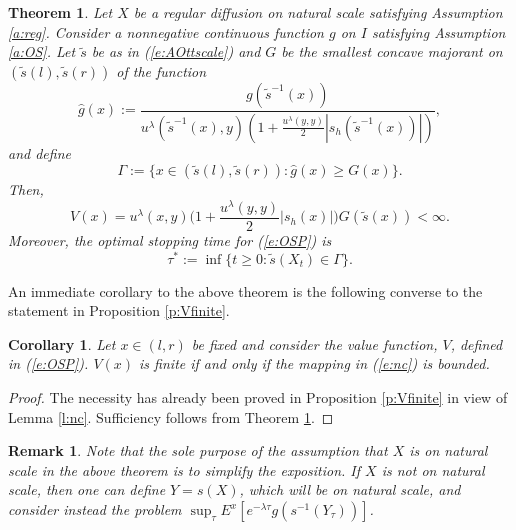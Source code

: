 \documentclass[11pt,reqno]{amsart}
\numberwithin{equation}{section}
\newtheorem{theorem}{Theorem}[section]
\newtheorem{corollary}{Corollary}[section]
\newtheorem{remark}{Remark}[section]
\begin{document}
\begin{theorem} \label{t:OS}
	Let $X$ be a regular diffusion on natural scale satisfying Assumption \ref{a:reg}. Consider  a nonnegative continuous function $g$  on $I$ satisfying Assumption \ref{a:OS}. Let $\tilde{s}$ be as in (\ref{e:AOttscale}) and $G$ be the smallest concave majorant on $(\tilde{s}(l),\tilde{s}(r))$ of the function
	\[
	\hat{g}(x):= \frac{g(\tilde{s}^{-1}(x))}{u^{\lambda}(\tilde{s}^{-1}(x),y)\left(1+\frac{u^{\lambda}(y,y)}{2}|s_h(\tilde{s}^{-1}(x))|\right)},
	\]
	and define
	\[
	\Gamma:=\{x \in (\tilde{s}(l),\tilde{s}(r)):\hat{g}(x)\geq G(x)\}.
\]
Then, 
\[
V(x)=u^{\lambda}(x,y)\Big(1+\frac{u^{\lambda}(y,y)}{2}|s_h(x)|\Big)G(\tilde{s}(x))<\infty.
\]
Moreover, the optimal stopping time for (\ref{e:OSP}) is
\[
\tau^*:=\inf\{t\geq 0:\tilde{s}(X_t) \in \Gamma\}.
\]
\end{theorem}
An immediate corollary to the above theorem is the following converse to the statement in Proposition \ref{p:Vfinite}. 
\begin{corollary} \label{c:Vfinite}
	Let $x \in (l,r)$ be fixed and consider the value function, $V$, defined in (\ref{e:OSP}). $V(x)$ is finite if and only if
	the mapping in (\ref{e:nc}) is bounded.
\end{corollary}
\begin{proof}
	The necessity has already been proved in Proposition \ref{p:Vfinite} in view of Lemma \ref{l:nc}.  Sufficiency follows from Theorem \ref{t:OS}. 
\end{proof}
\begin{remark}
	Note that the sole purpose of the assumption that $X$ is on natural scale in the above theorem is  to simplify the exposition. If $X$ is not on natural scale, then one can define $Y=s(X)$, which will be on natural scale, and consider instead the problem $\sup_{\tau}E^x[e^{-\lambda \tau}g(s^{-1}(Y_{\tau}))]$.
\end{remark}
\end{document}
